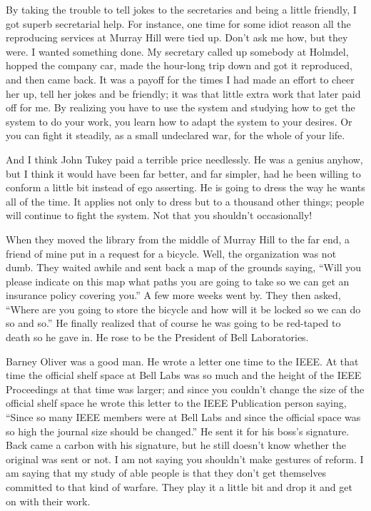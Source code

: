 \documentclass{article}
\begin{document}
By taking the trouble to tell jokes to the secretaries and being a little friendly, I got superb secretarial help. For instance, one time for some idiot reason all the reproducing services at Murray Hill were tied up. Don't ask me how, but they were. I wanted something done. My secretary called up somebody at Holmdel, hopped the company car, made the hour-long trip down and got it reproduced, and then came back. It was a payoff for the times I had made an effort to cheer her up, tell her jokes and be friendly; it was that little extra work that later paid off for me. By realizing you have to use the system and studying how to get the system to do your work, you learn how to adapt the system to your desires. Or you can fight it steadily, as a small undeclared war, for the whole of your life.

And I think John Tukey paid a terrible price needlessly. He was a genius anyhow, but I think it would have been far better, and far simpler, had he been willing to conform a little bit instead of ego asserting. He is going to dress the way he wants all of the time. It applies not only to dress but to a thousand other things; people will continue to fight the system. Not that you shouldn't occasionally!

When they moved the library from the middle of Murray Hill to the far end, a friend of mine put in a request for a bicycle. Well, the organization was not dumb. They waited awhile and sent back a map of the grounds saying, ``Will you please indicate on this map what paths you are going to take so we can get an insurance policy covering you.'' A few more weeks went by. They then asked, ``Where are you going to store the bicycle and how will it be locked so we can do so and so.'' He finally realized that of course he was going to be red-taped to death so he gave in. He rose to be the President of Bell Laboratories.

Barney Oliver was a good man. He wrote a letter one time to the IEEE. At that time the official shelf space at Bell Labs was so much and the height of the IEEE Proceedings at that time was larger; and since you couldn't change the size of the official shelf space he wrote this letter to the IEEE Publication person saying, ``Since so many IEEE members were at Bell Labs and since the official space was so high the journal size should be changed.'' He sent it for his boss's signature. Back came a carbon with his signature, but he still doesn't know whether the original was sent or not. I am not saying you shouldn't make gestures of reform. I am saying that my study of able people is that they don't get themselves committed to that kind of warfare. They play it a little bit and drop it and get on with their work.
\end{document}
